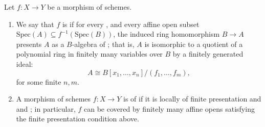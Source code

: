 \begin{definition} \label{definition:locally_of_finite_presentation_finite_presentation_morphism_of_schemes}
Let $f : X \to Y$ be a morphism of schemes. 
\begin{enumerate}
    \item We say that $f$ is  if for every  , and every affine open subset $\mathrm{Spec}(A) \subseteq f^{-1}(\mathrm{Spec}(B))$, the induced ring homomorphism $B \to A$ presents $A$ as a $B$-algebra of ; that is, $A$ is isomorphic to a quotient of a polynomial ring in finitely many variables over $B$ by a finitely generated ideal:
    $$A \cong B[x_1, \ldots, x_n] / (f_1, \ldots, f_m),$$
    for some finite $n,m$.

    \item A morphism of schemes $f : X \to Y$ is of  if it is locally of finite presentation and  and ; in particular, $f$ can be covered by finitely many affine opens satisfying the finite presentation condition above.
\end{enumerate}
\end{definition}